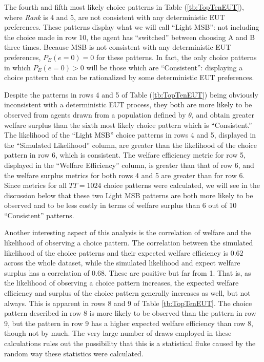 \documentclass[../main.tex]{subfiles}
\begin{document}
The fourth and fifth most likely choice patterns in Table (\ref{tb:TopTenEUT}), where \textit{Rank} is $4$ and $5$, are not consistent with any deterministic EUT preferences.
These patterns display what we will call \enquote{Light MSB}: not including the choice made in row 10, the agent has \enquote{switched} between choosing A and B three times.{\footnotemark}
Because MSB is not consistent with any deterministic EUT preferences, $P_E(e=0)=0$ for these patterns.
In fact, the only choice patterns in which $P_E(e=0)>0$ will be those which are \enquote{Consistent}: displaying a choice pattern that can be rationalized by some deterministic EUT preferences.

Despite the patterns in rows 4 and 5 of Table (\ref{tb:TopTenEUT}) being obviously inconsistent with a deterministic EUT process, they both are more likely to be observed from agents drawn from a population defined by $\theta$, and obtain greater welfare surplus than the sixth most likely choice pattern which is \enquote{Consistent.}
The likelihood of the \enquote{Light MSB} choice patterns in rows 4 and 5, displayed in the \enquote{Simulated Likelihood} column, are greater than the likelihood of the choice pattern in row 6, which is consistent.
The welfare efficiency metric for row 5, displayed in the \enquote{Welfare Efficiency} column, is greater than that of row 6, and the welfare surplus metrics for both rows 4 and 5 are greater than for row 6.
Since metrics for all $TT = 1024$ choice patterns were calculated, we will see in the discussion below that these two Light MSB patterns are both more likely to be observed and to be less costly in terms of welfare surplus than 6 out of 10 \enquote{Consistent} patterns.

\addtocounter{footnote}{-1}

Another interesting aspect of this analysis is the correlation of welfare and the likelihood of observing a choice pattern.
The correlation between the simulated likelihood of the choice patterns and their expected welfare efficiency is $0.62$ across the whole dataset, while the simulated likelihood and expect welfare surplus has a correlation of $0.68$.
These are positive but far from 1.
That is, as the likelihood of observing a choice pattern increases, the expected welfare efficiency and surplus of the choice pattern generally increases as well, but not always.
This is apparent in rows 8 and 9 of Table \ref{tb:TopTenEUT}.
The choice pattern described in row 8 is more likely to be observed than the pattern in row 9, but the pattern in row 9 has a higher expected welfare efficiency than row 8, though not by much.
The very large number of draws employed in these calculations rules out the possibility that this is a statistical fluke caused by the random way these statistics were calculated.
\end{document}
